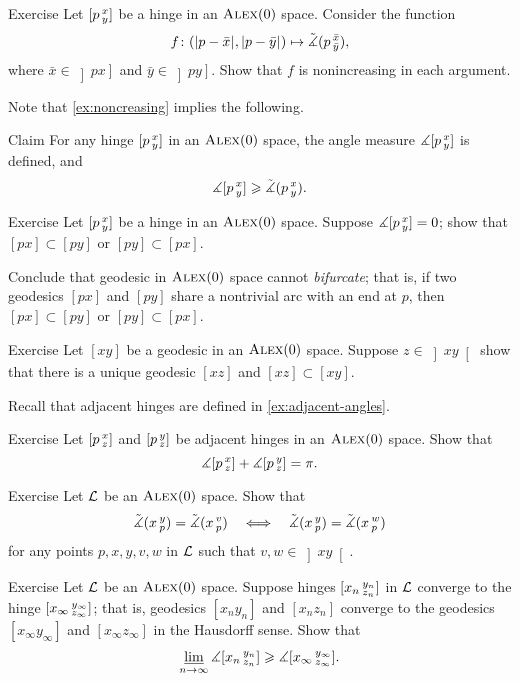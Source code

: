 \begin{thm}{Exercise}\label{ex:noncreasing}
Let $[p\,{}^{x}_{y}]$ be a hinge in an $\textsc{Alex}(0)$ space.
Consider the function
\[f\:(\dist{p}{\bar x}{},\dist{p}{\bar y}{})\mapsto \angk p{\bar x}{\bar y},\]
where $\bar x\in\left]p x\right]$ and $\bar y\in\left]p y\right]$.
Show that $f$ is nonincreasing in each argument.
\end{thm}

Note that \ref{ex:noncreasing} implies the following.

\begin{thm}{Claim}\label{clm:angle-defined}
For any hinge $[p\,{}^{x}_{y}]$ in an $\textsc{Alex}(0)$ 
space,
the angle measure $\measuredangle[p\,{}^{x}_{y}]$ is defined, and
\[\measuredangle[p\,{}^{x}_{y}]\geqslant \tilde\measuredangle(p\,{}^{x}_{y}).\]

\end{thm}

\begin{thm}{Exercise}\label{ex:0-angle}
Let $[p\,{}^{x}_{y}]$ be a hinge in an $\textsc{Alex}(0)$ space.
Suppose $\measuredangle[p\,{}^{x}_{y}]=0$; show that $[px]\subset [py]$ or $[py]\subset [px]$.

Conclude that geodesic in $\textsc{Alex}(0)$ space cannot \emph{bifurcate};
that is, if two geodesics $[px]$ and $[py]$ share a nontrivial arc with an end at $p$, then $[px]\subset [py]$ or $[py]\subset [px]$.
\end{thm}

\begin{thm}{Exercise}\label{ex:pi-angle}
Let $[xy]$ be a geodesic in an $\textsc{Alex}(0)$ space.
Suppose $z\in \left]xy\right[$ show that there is a unique geodesic $[xz]$ and $[xz]\subset [xy]$.
\end{thm}

Recall that adjacent hinges are defined in \ref{ex:adjacent-angles}.

\begin{thm}{Exercise}\label{ex:adjacent-CBB}
Let $[p\,{}^{x}_{z}]$ and $[p\,{}^{y}_{z}]$ be adjacent hinges in an $\textsc{Alex}(0)$ 
space.
Show that
\[\measuredangle[p\,{}^{x}_{z}]+\measuredangle[p\,{}^{y}_{z}]= \pi.\]
\end{thm}


\begin{thm}{Exercise}\label{ex:pxyvw}
Let $\mathcal{L}$ be an $\textsc{Alex}(0)$ 
space.
Show that  
\[
\tilde\measuredangle(x\,{}^{y}_{p})=\tilde\measuredangle(x\,{}^{v}_{p})
\quad\Longleftrightarrow\quad
\tilde\measuredangle(x\,{}^{y}_{p})=\tilde\measuredangle(x\,{}^{w}_{p})
\]
for any points
$p,x,y,v,w$ in $\mathcal{L}$ such that $v,w\in \left]xy\right[$.
\end{thm}

\begin{thm}{Exercise}\label{ex:angle-lim}
Let $\mathcal{L}$ be an $\textsc{Alex}(0)$ space.
Suppose hinges $[x_n\,{}^{y_n}_{z_n}]$ in $\mathcal{L}$ converge to the hinge $[x_\infty\,{}^{y_\infty}_{z_\infty}]$;
that is, geodesics $[x_ny_n]$ and $[x_nz_n]$ converge to the geodesics $[x_\infty y_\infty]$ and $[x_\infty z_\infty]$ in the Hausdorff sense.
Show that 
\[\varliminf_{n\to\infty}\measuredangle [x_n\,{}^{y_n}_{z_n}]\geqslant \measuredangle [x_\infty\,{}^{y_\infty}_{z_\infty}].\]
\end{thm}

